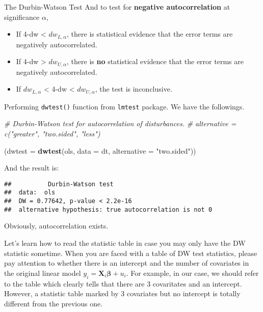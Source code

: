 \documentclass[
  12pt,
]{article}
\newenvironment{Shaded}{\begin{snugshade}}{\end{snugshade}}
\newcommand{\CommentTok}[1]{\textcolor[rgb]{0.56,0.35,0.01}{\textit{#1}}}
\newcommand{\DataTypeTok}[1]{\textcolor[rgb]{0.13,0.29,0.53}{#1}}
\newcommand{\KeywordTok}[1]{\textcolor[rgb]{0.13,0.29,0.53}{\textbf{#1}}}
\newcommand{\NormalTok}[1]{#1}
\newcommand{\StringTok}[1]{\textcolor[rgb]{0.31,0.60,0.02}{#1}}
\begin{document}
\begin{itembox}[1]{The Durbin-Watson Test}
And to test for \textbf{negative autocorrelation} at significance $\alpha$,

\begin{itemize}
\item If 4-dw < $dw_{L,\alpha}$, there is statistical evidence that the error terms are negatively autocorrelated.
\item If 4-dw > $dw_{U,\alpha}$, there is \textbf{no} statistical evidence that the error terms are negatively autocorrelated.
\item If $dw_{L,\alpha}$ < 4-dw < $dw_{U,\alpha} $, the test is inconclusive.
\end{itemize}

\end{itembox}

Performing \texttt{dwtest()} function from \texttt{lmtest} package. We have the followings.

\begin{Shaded}
\begin{Highlighting}[]
\CommentTok{\# Durbin{-}Watson test for autocorrelation of disturbances.}
\CommentTok{\# alternative = c("greater", "two.sided", "less")}
    
\NormalTok{(}\DataTypeTok{dwtest =} \KeywordTok{dwtest}\NormalTok{(ols, }\DataTypeTok{data =}\NormalTok{ dt, }\DataTypeTok{alternative =} \StringTok{"two.sided"}\NormalTok{)) }
\end{Highlighting}
\end{Shaded}

And the result is:

\begin{verbatim}
##          Durbin-Watson test
##  data:  ols
##  DW = 0.77642, p-value < 2.2e-16
##  alternative hypothesis: true autocorrelation is not 0
\end{verbatim}

Obviously, autocorrelation exists.

Let's learn how to read the statistic table in case you may only have the DW statistic sometime. When you are faced with a table of DW test statistics, please pay attention to whether there is an intercept and the number of covariates in the original linear model \(y_i = \mathbf{X}_i \mathbf{\beta} + u_i\). For example, in our case, we should refer to the table which clearly tells that there are 3 covaritates and an intercept. However, a statistic table marked by 3 covariates but no intercept is totally different from the previous one.
\end{document}
